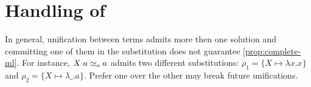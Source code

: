 \documentclass[sigconf,natbib=false,review]{acmart}
\newcommand{\appsep}{\ensuremath{\textcolor{lightgray}{\cdot}}}
\newcommand{\UnifRel}{\ensuremath{\simeq}}
\newcommand{\Uo}{\ensuremath{\UnifRel_o}\xspace}
\newcommand{\llambda}{\ensuremath{\mathcal{L}_\lambda}\xspace}
\newcommand{\Fo}{\ensuremath{\mathcal{F}_{\!o}\xspace}} %
\newcommand{\Ho}{\ensuremath{\mathcal{H}_o}\xspace}
\newcommand{\mapping}[3]{\ensuremath{#1 \mapsto #2^#3}}
\newcommand{\lhs}{\ensuremath{\mathrm{lhs}}\xspace}
\newcommand{\linkStore}{\ensuremath{\mathbb{L}}\xspace}
\begin{document}

\section{Handling of \notllambda}\label{sec:beta}


In general, unification between \notllambda terms admits more then one
solution and committing one of them in the substitution does not guarantee
\cref{prop:complete-ml}. For instance, $X \appsep a \Uo a$ 
admits two different substitutions: $\rho_1 = \{X \mapsto \lambda x.x\}$
and $\rho_2 = \{X \mapsto \lambda \_.a\}$. Prefer one over the other may break
future unifications.
\end{document}
